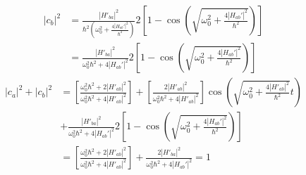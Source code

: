 \begin{align*}
    |c_b|^2 & =
    \frac{|H'_{ba}|^2}{\hbar^2\left(\omega_0^2 + \frac{4|H_{ab}'|^2}{\hbar^2}\right)}
    2
    \left[
        1 - \cos\left(
        \sqrt{\omega_0^2 + \frac{4|H_{ab}'|^2}{\hbar^2}}
        \right)
        \right] \\
            & =
    \frac{|H'_{ba}|^2}{\omega_0^2\hbar^2 + 4|H_{ab}'|^2}
    2
    \left[
        1 - \cos\left(
        \sqrt{\omega_0^2 + \frac{4|H_{ab}'|^2}{\hbar^2}}
        \right)
        \right]
\end{align*}
\begin{align*}
    |c_a|^2 + |c_b|^2 & =
    \left[\frac{\omega_0 ^2\hbar^2+   2|H'_{ab}|^2}{ \omega_0^2\hbar^2 + 4|H'_{ab}|^2}\right]
    +
    \left[\frac{  2|H'_{ab}|^2}{ \omega_0^2\hbar^2 + 4|H'_{ab}|^2}\right]
    \cos\left( \sqrt{\omega_0^2 + \frac{4|H'_{ab}|^2}{\hbar^2}} t\right) \\
                      & +
    \frac{|H'_{ba}|^2}{\omega_0^2\hbar^2 + 4|H_{ab}'|^2}
    2
    \left[
        1 - \cos\left(
        \sqrt{\omega_0^2 + \frac{4|H_{ab}'|^2}{\hbar^2}}
        \right)
        \right] \\
                      & =
    \left[\frac{\omega_0 ^2\hbar^2+   2|H'_{ab}|^2}{ \omega_0^2\hbar^2 + 4|H'_{ab}|^2}\right]
    +\frac{2|H'_{ba}|^2}{\omega_0^2\hbar^2 + 4|H_{ab}'|^2}
    = 1
\end{align*}

